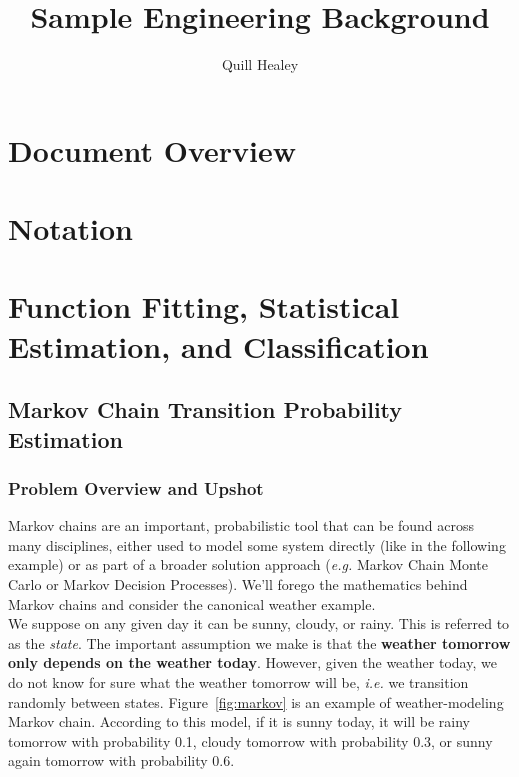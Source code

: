 \documentclass[12pt,reqno]{article}
\title{Sample Engineering Background}
\author{Quill Healey}
\theoremstyle{definition}
\numberwithin{equation}{section}
\begin{document}
\maketitle
\tableofcontents

\section*{Document Overview}


\section*{Notation}

\newpage

\section{Function Fitting, Statistical Estimation, and Classification}

\subsection{Markov Chain Transition Probability Estimation}

\subsubsection*{Problem Overview and Upshot}

Markov chains are an important, probabilistic tool that can be found across many disciplines,
either used to model some system directly (like in the following example) or as part of a broader solution
approach (\textit{e.g.} Markov Chain Monte Carlo or Markov Decision Processes). We'll forego the mathematics behind Markov chains and consider the canonical weather example.\\
\noindent We suppose on any given day it can be sunny, cloudy, or rainy. This is referred to as the \textit{state}. 
The important assumption we make is that the \textbf{weather tomorrow only depends on the weather today}.
However, given the weather today, we do not know for sure what the weather tomorrow will be, \textit{i.e.} we transition
randomly between states. Figure~\ref{fig:markov} is an example of weather-modeling Markov chain. According to this model,
if it is sunny today, it will be rainy tomorrow with probability 0.1, cloudy tomorrow with probability 0.3,
or sunny again tomorrow with probability 0.6.  
\end{document}
